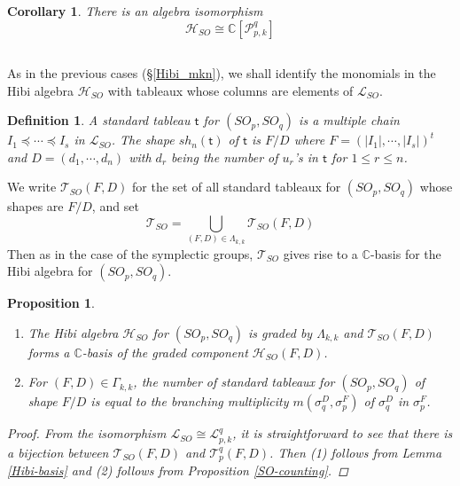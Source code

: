 \documentclass[11pt]{amsart}
\numberwithin{equation}{subsection}
\newtheorem{corollary}[theorem]{Corollary}
\newtheorem{definition}[theorem]{Definition}
\newtheorem{proposition}[theorem]{Proposition}
\begin{document}
\begin{corollary}\label{SO-Hibi-iso}
There is an algebra isomorphism
\begin{equation*}
\mathcal{H}_{SO} \cong \mathbb{C}[\mathcal{P}_{p,k}^{q}]
\end{equation*}
\end{corollary}


\subsection{}

As in the previous cases (\S \ref{Hibi_mkn}), we shall identify the monomials in 
the Hibi algebra $\mathcal{H}_{SO}$ with tableaux whose columns are elements of 
$\mathcal{L}_{SO}$.

\begin{definition}
A standard tableau $\mathsf{t}$ for $({SO}_{p},{SO}_{q})$ is a multiple
chain $I_{1}\preceq \cdots \preceq I_{s}$ in $\mathcal{L}_{SO}$. 
The shape $sh_{n}(\mathsf{t})$ of $\mathsf{t}$ is $F/D$ where 
$F=(|I_{1}|,\cdots ,|I_{s}|)^{t}$ and $D=(d_{1},\cdots ,d_{n})$
with $d_{r}$ being the number of $u_r$'s in $\mathsf{t}$ for $1\leq r\leq n$.
\end{definition}

We write $\mathcal{T}_{SO}(F,D)$ for the set of all standard
tableaux for $({SO}_{p},{SO}_{q})$ whose shapes are $F/D$, and set
\begin{equation*}
\mathcal{T}_{SO}=\bigcup_{(F,D)\in \Lambda _{k,k}}\mathcal{T}_{SO}(F,D)
\end{equation*}
Then as in the case of the symplectic groups, $\mathcal{T}_{SO}$ 
gives rise to a $\mathbb{C}$-basis for the Hibi algebra for $({SO}_{p},{SO}_{q})$. 


\begin{proposition} \label{SO_Hibi}
\begin{enumerate}
\item The Hibi algebra $\mathcal{H}_{SO}$ for $(SO_p, SO_q)$
is graded by $\Lambda _{k,k}$ and $\mathcal{T}_{SO}(F,D)$ forms a 
$\mathbb{C}$-basis of the graded component $\mathcal{H}_{SO}(F,D)$.

\item For $(F,D) \in \Gamma_{k,k}$, the number of standard tableaux 
for $(SO_p, SO_q)$ of shape $F/D$ is equal to the branching multiplicity 
$m(\sigma ^D_q, \sigma ^F_p)$ of $\sigma ^D_q$ in  $\sigma ^F_p$.
\end{enumerate}
\begin{proof}
From the isomorphism $\mathcal{L}_{SO} \cong \mathcal{L}^q_{p,k}$, 
it is straightforward to see that there is a bijection 
between $\mathcal{T}_{SO}(F,D)$ and $\mathcal{T}^q_p (F,D)$.
Then (1) follows from Lemma \ref{Hibi-basis} and
(2) follows from Proposition \ref{SO-counting}.
\end{proof}
\end{proposition}
\end{document}
